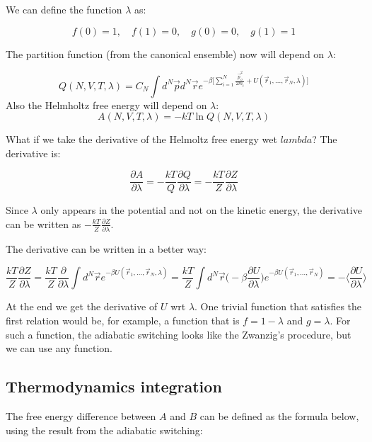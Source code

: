 	We can define the function $\lambda$ as:

	$$f(0) = 1, \quad f(1) = 0,\quad g(0) = 0, \quad g(1) = 1$$
	
	The partition function (from the canonical ensemble) now will depend on $\lambda$:

	$$Q(N, V, T, \lambda) = C_N\int d^N\vec{p}d^N\vec{r}e^{-\beta\biggl[\sum\limits_{i=1}^N\frac{\vec{p}_o^2}{2m_i}+U(\vec{r}_1, \dots, \vec{r}_N, \lambda)\biggr]}$$
Also the Helmholtz free energy will depend on $\lambda$:
	$$A(N, V, T, \lambda) = -kT\ln Q(N, V, T, \lambda)$$
	
	What if we take the derivative of the Helmoltz free energy wet $lambda$?
	The derivative is:

	$$\frac{\partial A}{\partial \lambda} = -\frac{kT}{Q}\frac{\partial Q}{\partial \lambda} = -\frac{kT}{Z}\frac{\partial Z}{\partial\lambda}$$
	
	Since $\lambda$ only appears in the potential and not on the kinetic energy, the derivative can be written as $-\frac{kT}{Z}\frac{\partial Z}{\partial\lambda}$.
	
	The derivative can be written in a better way:

	$$\frac{kT}{Z}\frac{\partial Z}{\partial \lambda} = \frac{kT}{Z}\frac{\partial}{\partial\lambda}\int d^N\vec{r}e^{-\beta U(\vec{r}_1, \dots, \vec{r}_N, \lambda)} = \frac{kT}{Z}\int d^{N}\vec{r}\biggl(-\beta\frac{\partial U}{\partial\lambda}\biggr)e^{-\beta U(\vec{r}_1, \dots, \vec{r}_N)} = -\biggl\langle\frac{\partial U}{\partial\lambda}\biggr\rangle$$

	At the end we get the derivative of $U$ wrt $\lambda$. One trivial function that satisfies the first relation would be, for example, a function that is $f = 1-\lambda$ and $g = \lambda$. 
	For such a  function, the adiabatic switching looks like the Zwanzig's procedure, but we can use any function.
	

	\subsection{Thermodynamics integration}

	The free energy difference between $A$ and $B$ can be defined as the formula below, using the result from the adiabatic switching:

